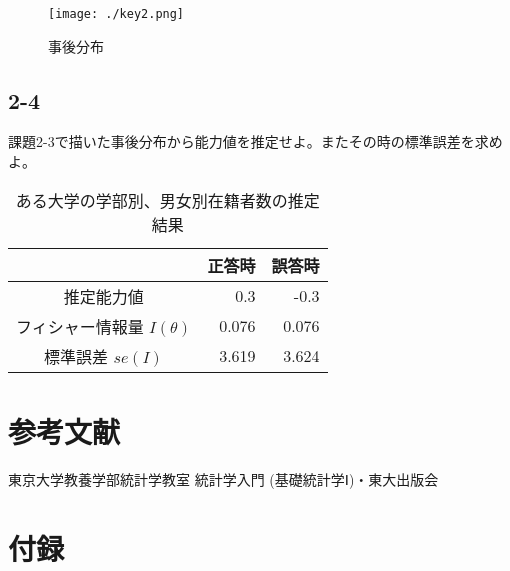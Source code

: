 \documentclass{jsarticle}
\begin{document}
\begin{figure}[H]
  \centering
  \texttt{[image: ./key2.png]}
  \caption{事後分布}
\end{figure}

\subsection{2-4}
課題2-3で描いた事後分布から能力値を推定せよ。またその時の標準誤差を求めよ。

    \begin{table}[htb]
      \begin{center}
        \caption{ある大学の学部別、男女別在籍者数の推定結果}
        {\scriptsize
        \begin{tabular}{|c|r|r|} \hline
                                       & 正答時 & 誤答時   \\ \hline
          推定能力値                   & 0.3    & -0.3     \\
          フィシャー情報量 $I(\theta)$ & 0.076  & 0.076    \\
          標準誤差 $se(I)$             & 3.619  & 3.624  \\ \hline
        \end{tabular}
        }
      \end{center}
    \end{table}


\section{参考文献}
\begin{thebibliography}{9}
   東京大学教養学部統計学教室 統計学入門 (基礎統計学Ⅰ)・東大出版会
\end{thebibliography}

\section{付録}
\end{document}
